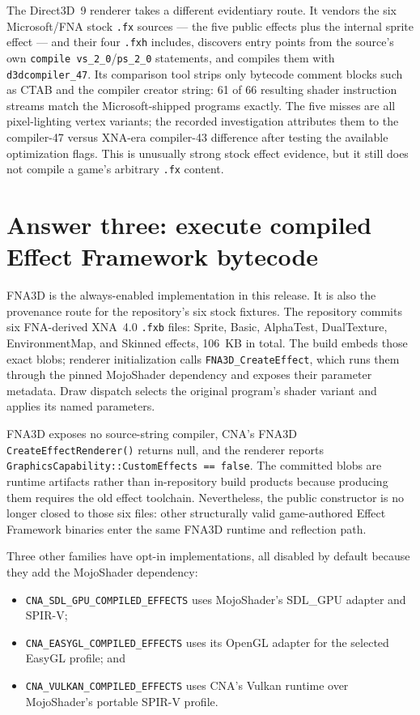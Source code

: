 The Direct3D~9 renderer takes a different evidentiary route.  It vendors the six Microsoft/FNA
stock \texttt{.fx} sources --- the five public effects plus the internal sprite effect --- and
their four \texttt{.fxh} includes, discovers entry points from the source's own
\texttt{compile vs\_2\_0}/\texttt{ps\_2\_0} statements, and compiles them with
\texttt{d3dcompiler\_47}.  Its comparison tool strips only bytecode comment blocks such as CTAB
and the compiler creator string: 61 of 66 resulting shader instruction streams match the
Microsoft-shipped programs exactly.  The five misses are all pixel-lighting vertex variants;
the recorded investigation attributes them to the compiler-47 versus XNA-era compiler-43
difference after testing the available optimization flags.  This is unusually strong stock
effect evidence, but it still does not compile a game's arbitrary \texttt{.fx} content.

\section{Answer three: execute compiled Effect Framework bytecode}

FNA3D is the always-enabled implementation in this release. It is also the provenance route for
the repository's six stock fixtures.
The repository commits six FNA-derived XNA~4.0 \texttt{.fxb} files: Sprite, Basic, AlphaTest,
DualTexture, EnvironmentMap, and Skinned effects, 106~KB in total.  The build embeds those exact
blobs; renderer initialization calls \texttt{FNA3D\_CreateEffect}, which runs them through the
pinned MojoShader dependency and exposes their parameter metadata.  Draw dispatch selects the
original program's shader variant and applies its named parameters.

FNA3D exposes no source-string compiler, CNA's FNA3D \texttt{CreateEffectRenderer()} returns null,
and the renderer reports \texttt{GraphicsCapability::CustomEffects == false}. The committed
blobs are runtime artifacts rather than in-repository build products because producing them
requires the old effect toolchain. Nevertheless, the public constructor is no longer closed to
those six files: other structurally valid game-authored Effect Framework binaries enter the same
FNA3D runtime and reflection path.

Three other families have opt-in implementations, all disabled by default because they add the
MojoShader dependency:

\begin{itemize}
  \item \texttt{CNA\_SDL\_GPU\_COMPILED\_EFFECTS} uses MojoShader's SDL\_GPU adapter and SPIR-V;
  \item \texttt{CNA\_EASYGL\_COMPILED\_EFFECTS} uses its OpenGL adapter for the selected EasyGL
    profile; and
  \item \texttt{CNA\_VULKAN\_COMPILED\_EFFECTS} uses CNA's Vulkan runtime over MojoShader's
    portable SPIR-V profile.
\end{itemize}

